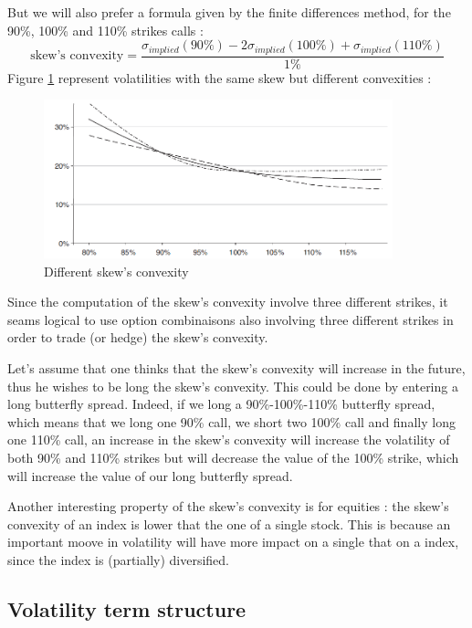 \documentclass[hidelinks]{article}
\theoremstyle{definition}
\begin{document}
   But we will also prefer a formula given by the finite differences method, for the 90\%, 100\% and 110\% strikes calls :
   $$\text{skew's convexity} = \frac{\sigma_{implied}(90\%) - 2 \sigma_{implied}(100\%) + \sigma_{implied}(110\%)}{1\%}$$
   Figure \ref{fig:skew_convexity} represent volatilities with the same skew but different convexities :
   \begin{figure}[!h]
	\centering
	\includegraphics[width=0.9\textwidth]{skew_convexity.png}
    \caption{Different skew's convexity}
    \label{fig:skew_convexity}
    \end{figure}
    
   Since the computation of the skew's convexity involve three different strikes, it seams logical to use option combinaisons also involving three different strikes in order to trade (or hedge) the skew's convexity. 
   
   Let's assume that one thinks that the skew's convexity will increase in the future, thus he wishes to be long the skew's convexity. This could be done by entering a long butterfly spread. Indeed, if we long a 90\%-100\%-110\% butterfly spread, which means that we long one 90\% call, we short two 100\% call and finally long one 110\% call, an increase in the skew's convexity will increase the volatility of both 90\% and 110\% strikes but will decrease the value of the 100\% strike, which will increase the value of our long butterfly spread.
   
   Another interesting property of the skew's convexity is for equities : the skew's convexity of an index is lower that the one of a single stock. This is because an important moove in volatility will have more impact on a single that on a index, since the index is (partially) diversified.
   \newpage
   \subsection{Volatility term structure}
   
\end{document}
